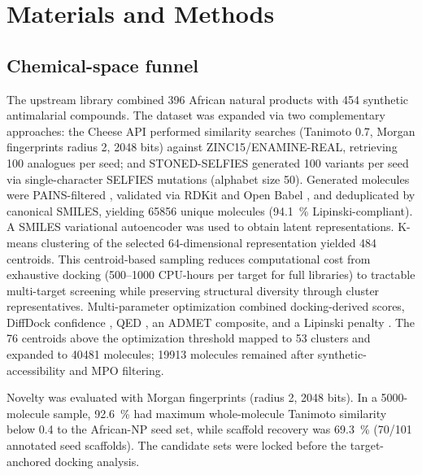 \documentclass[11pt,a4paper]{article}
\begin{document}
	\section{Materials and Methods}\label{sec:methods}
	\subsection{Chemical-space funnel}\label{sec:methods_funnel}
	The upstream library combined \num{396} African natural products with \num{454} synthetic antimalarial compounds. The dataset was expanded via two complementary approaches: the Cheese API \cite{lzicar_cheese_2024} performed similarity searches (Tanimoto \num{0.7}, Morgan fingerprints radius \num{2}, \num{2048} bits) against ZINC15/ENAMINE-REAL, retrieving \num{100} analogues per seed; and STONED-SELFIES \cite{Nigam2021} generated \num{100} variants per seed via single-character SELFIES mutations (alphabet size \num{50}). Generated molecules were PAINS-filtered \cite{Baell2010}, validated via RDKit and Open Babel \cite{OBoyle2011}, and deduplicated by canonical SMILES, yielding \num{65856} unique molecules (\qty{94.1}{\percent} Lipinski-compliant). A SMILES variational autoencoder \cite{gomez2018automatic} was used to obtain latent representations. K-means clustering of the selected 64-dimensional representation yielded \num{484} centroids. This centroid-based sampling reduces computational cost from exhaustive docking (\numrange{500}{1000} CPU-hours per target for full libraries) to tractable multi-target screening while preserving structural diversity through cluster representatives. Multi-parameter optimization combined docking-derived scores, DiffDock confidence \cite{Corso2023}, QED \cite{Bickerton2012}, an ADMET composite, and a Lipinski penalty \cite{Lipinski2004}. The \num{76} centroids above the optimization threshold mapped to \num{53} clusters and expanded to \num{40481} molecules; \num{19913} molecules remained after synthetic-accessibility and MPO filtering.
	
	Novelty was evaluated with Morgan fingerprints \cite{Rogers2010} (radius \num{2}, \num{2048} bits). In a \num{5000}-molecule sample, \qty{92.6}{\percent} had maximum whole-molecule Tanimoto similarity below \num{0.4} to the African-NP seed set, while scaffold recovery was \qty{69.3}{\percent} (\num{70}/\num{101} annotated seed scaffolds). The candidate sets were locked before the target-anchored docking analysis.
	
\end{document}
